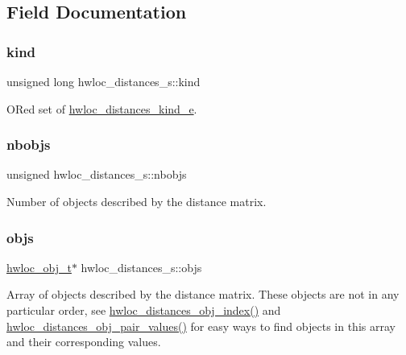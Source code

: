 \subsection{Field Documentation}
\mbox{\label{a00310_aef9c83cf467da1b1fa4c36493febb3b5}} 
\subsubsection{\texorpdfstring{kind}{kind}}
{\footnotesize\ttfamily unsigned long hwloc\+\_\+distances\+\_\+s\+::kind}



OR\textquotesingle{}ed set of \hyperlink{a00208_gab1bb10d3adb85b52cdc6fe5a7f74f108}{hwloc\+\_\+distances\+\_\+kind\+\_\+e}. 

\mbox{\label{a00310_a4ca2af858cebbce7324ec49903d09474}} 
\subsubsection{\texorpdfstring{nbobjs}{nbobjs}}
{\footnotesize\ttfamily unsigned hwloc\+\_\+distances\+\_\+s\+::nbobjs}



Number of objects described by the distance matrix. 

\mbox{\label{a00310_af1e78b2d628d191fa6cae3fbfe891078}} 
\subsubsection{\texorpdfstring{objs}{objs}}
{\footnotesize\ttfamily \hyperlink{a00185_ga79b8ab56877ef99ac59b833203391c7d}{hwloc\+\_\+obj\+\_\+t}$\ast$ hwloc\+\_\+distances\+\_\+s\+::objs}



Array of objects described by the distance matrix. These objects are not in any particular order, see \hyperlink{a00209_gab9e770c7d56c5d6040f26bd1dc8854cd}{hwloc\+\_\+distances\+\_\+obj\+\_\+index()} and \hyperlink{a00209_ga3c665b23056e3269f777b21a67148c82}{hwloc\+\_\+distances\+\_\+obj\+\_\+pair\+\_\+values()} for easy ways to find objects in this array and their corresponding values. 


